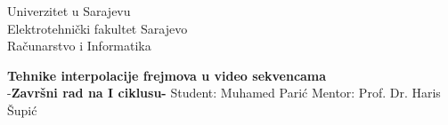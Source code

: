 \documentclass[12pt]{report}
\begin{document}
\begin{titlepage}
\begin{flushleft}
Univerzitet u Sarajevu \\
Elektrotehni\v{c}ki fakultet Sarajevo \\
Ra\v{c}unarstvo i Informatika
\end{flushleft}
\center
\vspace{100px}
\LARGE{\textbf{Tehnike interpolacije frejmova u video sekvencama}} \\
\large{-\textbf{Zavr\v{s}ni rad na I ciklusu-}}
\vfill
Student: Muhamed Pari\'{c}
\hfill
Mentor: Prof. Dr. Haris \v{S}upi\'{c} 
\end{titlepage}
\end{document}
